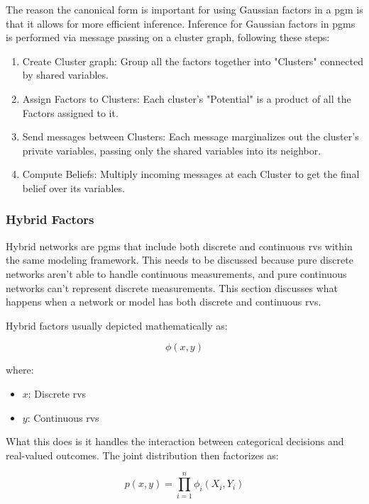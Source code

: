 \documentclass[12pt,a4paper]{article}
\begin{document}
The reason the canonical form is important for using Gaussian factors in a \acs{pgm} is that it allows for more efficient inference. Inference for Gaussian factors in \acs{pgm}s is performed via message passing on a cluster graph, following these steps:

\begin{enumerate}
	\item Create Cluster graph: Group all the factors together into "Clusters" connected by shared variables.
	\item Assign Factors to Clusters: Each cluster's "Potential" is a product of all the Factors assigned to it.
	\item Send messages between Clusters: Each message marginalizes out the cluster's private variables, passing only the shared variables into its neighbor.
	\item Compute Beliefs: Multiply incoming messages at each Cluster to get the final belief over its variables.
\end{enumerate}

\subsubsection{Hybrid Factors}
Hybrid networks are \acs{pgm}s that include both discrete and continuous \acs{rv}s within the same modeling framework. This needs to be discussed because pure discrete networks aren't able to handle continuous measurements, and pure continuous networks can't represent discrete measurements. This section discusses what happens when a network or model has both discrete and continuous \acs{rv}s.

Hybrid factors usually depicted mathematically as:

\begin{equation}\phi(x,y)\end{equation}

where:
\begin{itemize}
	\item $x$: Discrete \acs{rv}s
	\item $y$: Continuous \acs{rv}s
\end{itemize}

What this does is it handles the interaction between categorical decisions and real-valued outcomes. The joint distribution then factorizes as:

\begin{equation}p(x,y) = \prod_{i=1}^{n} \phi_i(X_i, Y_i)\end{equation}
\end{document}
